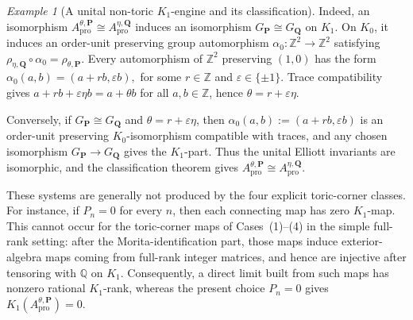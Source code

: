 \documentclass[11pt]{amsart}
\theoremstyle{definition}
\theoremstyle{remark}
\newtheorem{example}[theorem]{Example}
\newcommand{\Z}{\mathbb{Z}}
\newcommand{\Q}{\mathbb Q}
\newcommand{\ex}{\mathrm{pro}}
\begin{document}
\begin{example}[A unital non-toric $K_1$-engine and its classification]
Indeed, an isomorphism $A_{\ex}^{\theta,\mathbf P}
\cong
A_{\ex}^{\eta,\mathbf Q}$
induces an isomorphism $G_{\mathbf P}\cong G_{\mathbf Q}$
on $K_1$. On $K_0$, it induces an order-unit preserving group automorphism $\alpha_0\colon\Z^2\to\Z^2$
satisfying $\rho_{\eta,\mathbf Q}\circ\alpha_0=\rho_{\theta,\mathbf P}.$
Every automorphism of $\Z^2$ preserving $(1,0)$ has the form $\alpha_0(a,b)=(a+rb,\varepsilon b),$ for some $r\in\Z$ and $\varepsilon\in\{\pm1\}.$
Trace compatibility gives $a+rb+\varepsilon\eta b=a+\theta b$
for all $a,b\in\Z$, hence $\theta=r+\varepsilon\eta.$

Conversely, if $G_{\mathbf P}\cong G_{\mathbf Q}$ and
$\theta=r+\varepsilon\eta$, then $\alpha_0(a,b):=(a+rb,\varepsilon b)$
is an order-unit preserving $K_0$-isomorphism compatible with traces, and any
chosen isomorphism $G_{\mathbf P}\to G_{\mathbf Q}$
gives the $K_1$-part. Thus the unital Elliott invariants are isomorphic, and
the classification theorem gives $A_{\ex}^{\theta,\mathbf P}
\cong
A_{\ex}^{\eta,\mathbf Q}.$

These systems are generally not produced by the four explicit toric-corner
classes. For instance, if $P_n=0$ for every $n$, then each connecting map
has zero $K_1$-map. This cannot occur for the toric-corner maps of
Cases~\textup{(1)}--\textup{(4)} in the simple full-rank setting: after the
Morita-identification part, those maps induce exterior-algebra maps coming from
full-rank integer matrices, and hence are injective after tensoring with
$\Q$ on $K_1$. Consequently, a direct limit built from such maps has
nonzero rational $K_1$-rank, whereas the present choice \(P_n=0\) gives $K_1(A_{\ex}^{\theta,\mathbf P})=0.$
\end{example}
\end{document}
